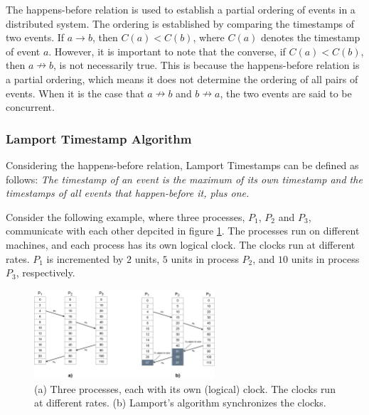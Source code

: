 \documentclass{article}
\begin{document}
    The happens-before relation is used to establish a partial ordering of events in a distributed system. The ordering is established by comparing the timestamps of two events. If $a \rightarrow b$, then $C(a) < C(b)$, where $C(a)$ denotes the timestamp of event $a$. However, it is important to note that the converse, if $C(a) < C(b)$, then $a \nrightarrow b$, is not necessarily true. This is because the happens-before relation is a partial ordering, which means it does not determine the ordering of all pairs of events. When it is the case that $a \nrightarrow b$ and $b \nrightarrow a$, the two events are said to be concurrent.

  \subsubsection{Lamport Timestamp Algorithm}\label{sec:lamport_timestamp_algorithm}
    Considering the happens-before relation, Lamport Timestamps can be defined as follows: \textit{The timestamp of an event is the maximum of its own timestamp and the timestamps of all events that happen-before it, plus one.} 

    Consider the following example, where three processes, $P_1$, $P_2$ and $P_3$, communicate with each other depcited in figure \ref{fig:lamport_timestamp}. The processes run on different machines, and each process has its own logical clock. The clocks run at different rates. $P_1$ is incremented by $2$ units, $5$ units in process $P_2$, and $10$ units in process $P_3$, respectively.
    \begin{figure}[h!]
      \centering
      \includegraphics[width=0.6\textwidth]{img/lamport_timestamp.png}
      \caption{(a) Three processes, each with its own (logical) clock. The clocks run at different rates. (b) Lamport's algorithm synchronizes the clocks.}
      \label{fig:lamport_timestamp}
    \end{figure}
\end{document}
